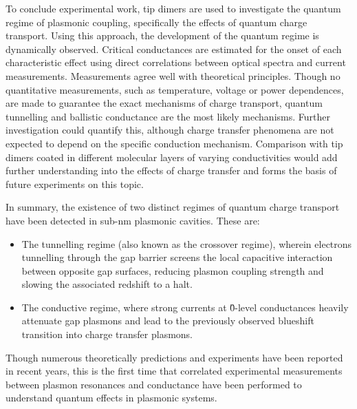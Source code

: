 \documentclass[12pt, a4paper, twoside]{book}
\begin{document}
To conclude experimental work, tip dimers are used to investigate the quantum regime of plasmonic coupling, specifically the effects of quantum charge transport. Using this approach, the development of the quantum regime is dynamically observed. Critical conductances are estimated for the onset of each characteristic effect using direct correlations between optical spectra and current measurements. Measurements agree well with theoretical principles. Though no quantitative measurements, such as temperature, voltage or power dependences, are made to guarantee the exact mechanisms of charge transport, quantum tunnelling and ballistic conductance are the most likely mechanisms. Further investigation could quantify this, although charge transfer phenomena are not expected to depend on the specific conduction mechanism. Comparison with tip dimers coated in different molecular layers of varying conductivities would add further understanding into the effects of charge transfer and forms the basis of future experiments on this topic.

In summary, the existence of two distinct regimes of quantum charge transport have been detected in sub-nm plasmonic cavities. These are:
\begin{itemize}
\item The tunnelling regime (also known as the crossover regime), wherein electrons tunnelling through the gap barrier screens the local capacitive interaction between opposite gap surfaces, reducing plasmon coupling strength and slowing the associated redshift to a halt.
\item The conductive regime, where strong currents at \G0-level conductances heavily attenuate gap plasmons and lead to the previously observed blueshift transition into charge transfer plasmons.
\end{itemize}
Though numerous theoretically predictions and experiments have been reported in recent years, this is the first time that correlated experimental measurements between plasmon resonances and conductance have been performed to understand quantum effects in plasmonic systems.

\ifstandalone
\begin{singlespace}
\fontsize{8pt}{1em}\selectfont
\printbibliography[notcategory=fullcited]
\end{singlespace}
\fi
\end{document}
